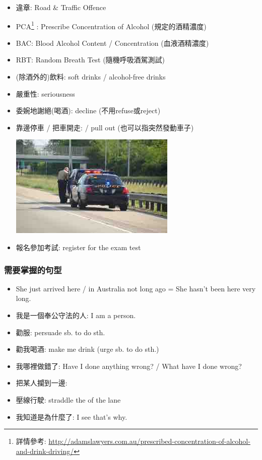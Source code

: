 \begin{itemize}
  \item 違章: Road \& Traffic Offence
  \item PCA\footnote{詳情參考: \url{http://adamslawyers.com.au/prescribed-concentration-of-alcohol-and-drink-driving/}} : Prescribe Concentration of Alcohol (規定的酒精濃度)
  \item BAC: Blood Alcohol Content / Concentration (血液酒精濃度)
  \item RBT: Random Breath Test (隨機呼吸酒駕測試)
  \item (除酒外的)飲料: soft drinks / alcohol-free drinks
  \item 嚴重性: seriousness
  \item 委婉地謝絕(喝酒): decline (不用refuse或reject)
  \item 靠邊停車 / 把車開走:   / pull out (也可以指突然發動車子)
  \begin{center}
    \includegraphics[scale=.7]{pics/pull-over}
  \end{center}
  \item 報名參加考試: register for the exam test
\end{itemize}

\subsubsection*{需要掌握的句型}
\begin{itemize}
  \itemsep0em
  \item She just arrived here / in Australia not long ago = She hasn’t been here very long.
  \item 我是一個奉公守法的人: I am a  person.
  \item 勸服: persuade sb. to do sth.
  \item 勸我喝酒: make me drink (urge sb. to do sth.)
  \item 我哪裡做錯了: Have I done anything wrong? / What have I done wrong?
  \item 把某人攔到一邊: 
  \item 壓線行駛: straddle the  of the lane
  \item 我知道是為什麼了: I see that’s why.
\end{itemize}

